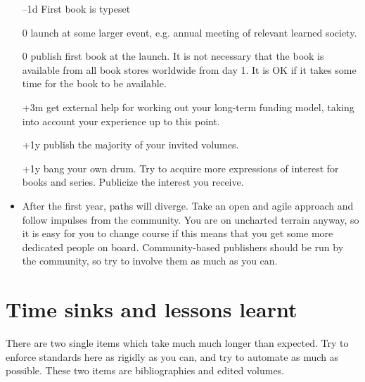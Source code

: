 \documentclass[nonflat,smallfont
]{langsci/langscibook}
\begin{document}
\begin{itemize}
 \item[--1d] First book is typeset
 \item[0] launch at some larger event, e.g. annual meeting of relevant learned society. 
 \item[0] publish first book at the launch. It is not necessary that the book is available from all book stores worldwide from day 1. It is OK if it takes some time for the book to be available. 
 \item[+3m] get external help for working out your long-term funding model, taking into account your experience up to this point. 
 \item[+1y] publish the majority of your invited volumes. 
 \item[+1y] bang your own drum. Try to acquire more expressions of interest for books and series. Publicize the interest you receive. 
 \item After the first year, paths will diverge. Take an open and agile approach and follow impulses from the community. You are on uncharted terrain anyway, so it is easy for you to change course if this means that you get some more dedicated people on board. Community-based publishers should be run by the community, so try to involve them as much as you can.
\end{itemize}


\chapter{Time sinks and lessons learnt}
\largerpage[2]
There are two single items which take much much longer than expected. Try to enforce standards here as rigidly as you can, and try to automate as much as possible. These two items are bibliographies and edited volumes. 
\end{document}
